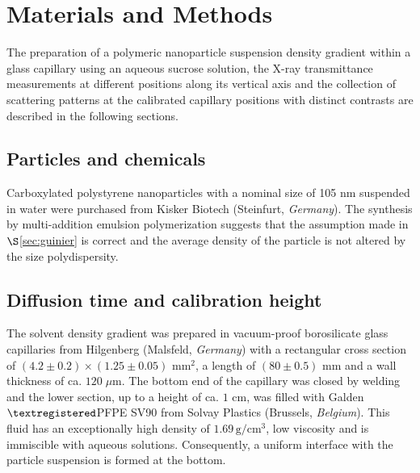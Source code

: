 \section{Materials and Methods}
The preparation of a polymeric nanoparticle suspension density gradient within a glass capillary using an aqueous sucrose solution, the X-ray transmittance measurements at different positions along its vertical axis and the collection of scattering patterns at the calibrated capillary positions with distinct contrasts are described in the following sections. 

\subsection{Particles and chemicals}
Carboxylated polystyrene nanoparticles with a nominal size of 105 nm suspended in water were purchased from Kisker Biotech (Steinfurt, \emph{Germany}). The synthesis by multi-addition emulsion polymerization suggests that the assumption made in \(\S\)\ref{sec:guinier} is correct and the average density of the particle is not altered by the size polydispersity.


\subsection{Diffusion time and calibration height}
The solvent density gradient was prepared in vacuum-proof borosilicate glass capillaries from Hilgenberg (Malsfeld, \emph{Germany}) with a rectangular cross section of \( (4.2\pm0.2)\times(1.25\pm0.05)\mbox{ mm}^2\),  a length of \((80\pm0.5) \mbox{ mm} \) and a wall thickness of ca. \(120\;\mu\mbox{m}\). The bottom end of the capillary was closed by welding and the lower section, up to a height of ca. \(1\) cm, was filled with Galden\(\textregistered\)PFPE SV90 from Solvay Plastics (Brussels, \emph{Belgium}). This fluid has an exceptionally high density of $1.69\,\mathrm{g/cm^3}$, low viscosity and is immiscible with aqueous solutions. Consequently, a uniform interface with the particle suspension is formed at the bottom. 

